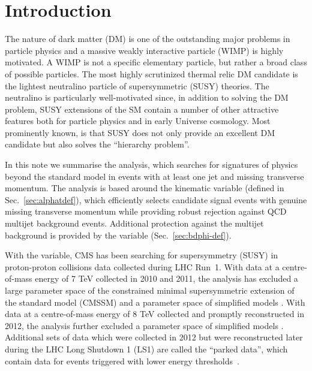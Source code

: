 \section{Introduction}
\label{sec:intro}

The nature of dark matter (DM) is one of the outstanding major
problems in particle physics and a massive weakly interactive particle
(WIMP) is highly motivated. A WIMP is not a specific elementary
particle, but rather a broad class of possible particles. The most
highly scrutinized thermal relic DM candidate is the lightest
neutralino particle of supersymmetric (SUSY) theories. The neutralino
is particularly well-motivated since, in addition to solving the DM
problem, SUSY extensions of the SM contain a number of other
attractive features both for particle physics and in early Universe
cosmology. Most prominently known, is that SUSY does not only provide
an excellent DM candidate but also solves the ``hierarchy problem''.

In this note we summarise the \alphat analysis, which searches for
signatures of physics beyond the standard model in events with at
least one jet and missing transverse momentum. The analysis is based
around the kinematic variable \alphat (defined in
Sec.~\ref{sec:alphatdef}), which efficiently selects candidate signal
events with genuine missing transverse momentum while providing robust
rejection against QCD multijet background events. Additional
protection against the multijet background is provided by the \bdphi
variable (Sec.~\ref{sec:bdphi-def}).

With the \alphat variable, CMS has been searching for supersymmetry
(SUSY) in proton-proton collisions data collected during LHC
Run~1. With data at a centre-of-mass energy of 7 TeV collected in 2010
and 2011, the \alphat analysis has excluded a large parameter space of
the constrained minimal supersymmetric extension of the standard model
(CMSSM) \cite{Khachatryan:2011tk, Chatrchyan:2011zy,
  Chatrchyan:2012wa} and a parameter space of simplified models
\cite{Chatrchyan:2012wa}. With data at a centre-of-mass energy of 8
TeV collected and promptly reconstructed in 2012, the \alphat analysis
further excluded a parameter space of simplified models
\cite{Chatrchyan:2013lya}. Additional sets of data which were
collected in 2012 but were reconstructed later during the LHC Long
Shutdown 1 (LS1) are called the ``parked data'', which contain data
for events triggered with lower energy
thresholds~\cite{Khachatryan:2016pxa}.  


